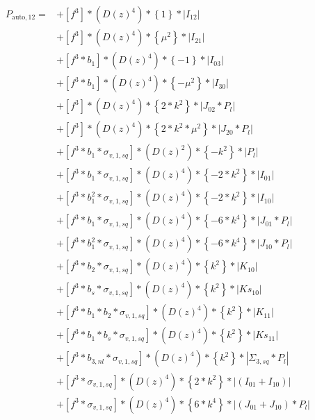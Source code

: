 \documentclass{article}
\begin{document}
\begin{equation}
\begin{aligned}  
P_{\mathrm{auto},12}=
&+\left[f^{3}\right]*\left(D(z)^{4}\right)*\left\{1\right\}*\left|I_{12}\right| \\
&+\left[f^{3}\right]*\left(D(z)^{4}\right)*\left\{\mu^{2}\right\}*\left|I_{21}\right| \\
&+\left[f^{3}*b_{1}\right]*\left(D(z)^{4}\right)*\left\{-1\right\}*\left|I_{03}\right| \\
&+\left[f^{3}*b_{1}\right]*\left(D(z)^{4}\right)*\left\{-\mu^{2}\right\}*\left|I_{30}\right| \\
&+\left[f^{3}\right]*\left(D(z)^{4}\right)*\left\{2*k^{2}\right\}*\left|J_{02}*P_l\right| \\
&+\left[f^{3}\right]*\left(D(z)^{4}\right)*\left\{2*k^{2}*\mu^{2}\right\}*\left|J_{20}*P_l\right| \\
&+\left[f^{3}*b_{1}*\sigma_{v,1,sq}\right]*\left(D(z)^{2}\right)*\left\{-k^{2}\right\}*\left|P_l\right| \\
&+\left[f^{3}*b_{1}*\sigma_{v,1,sq}\right]*\left(D(z)^{4}\right)*\left\{-2*k^{2}\right\}*\left|I_{01}\right| \\
&+\left[f^{3}*b_{1}^{2}*\sigma_{v,1,sq}\right]*\left(D(z)^{4}\right)*\left\{-2*k^{2}\right\}*\left|I_{10}\right| \\
&+\left[f^{3}*b_{1}*\sigma_{v,1,sq}\right]*\left(D(z)^{4}\right)*\left\{-6*k^{4}\right\}*\left|J_{01}*P_l\right| \\
&+\left[f^{3}*b_{1}^{2}*\sigma_{v,1,sq}\right]*\left(D(z)^{4}\right)*\left\{-6*k^{4}\right\}*\left|J_{10}*P_l\right| \\
&+\left[f^{3}*b_{2}*\sigma_{v,1,sq}\right]*\left(D(z)^{4}\right)*\left\{k^{2}\right\}*\left|K_{10}\right| \\
&+\left[f^{3}*b_{s}*\sigma_{v,1,sq}\right]*\left(D(z)^{4}\right)*\left\{k^{2}\right\}*\left|Ks_{10}\right| \\
&+\left[f^{3}*b_{1}*b_{2}*\sigma_{v,1,sq}\right]*\left(D(z)^{4}\right)*\left\{k^{2}\right\}*\left|K_{11}\right| \\
&+\left[f^{3}*b_{1}*b_{s}*\sigma_{v,1,sq}\right]*\left(D(z)^{4}\right)*\left\{k^{2}\right\}*\left|Ks_{11}\right| \\
&+\left[f^{3}*b_{3,nl}*\sigma_{v,1,sq}\right]*\left(D(z)^{4}\right)*\left\{k^{2}\right\}*\left|\Sigma_{3,sq}*P_l\right| \\
&+\left[f^{3}*\sigma_{v,1,sq}\right]*\left(D(z)^{4}\right)*\left\{2*k^{2}\right\}*\left|(I_{01}+I_{10})\right| \\
&+\left[f^{3}*\sigma_{v,1,sq}\right]*\left(D(z)^{4}\right)*\left\{6*k^{4}\right\}*\left|(J_{01}+J_{10})*P_l\right| \\
\end{aligned}
\end{equation}
\end{document}
